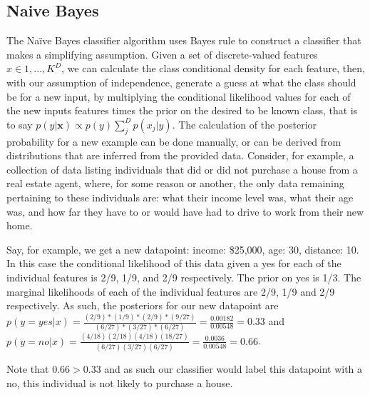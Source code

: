\subsection{Naive Bayes}
The Na\"{i}ve Bayes classifier algorithm uses Bayes rule to construct a classifier
that makes a simplifying assumption. Given a set of discrete-valued
features $x \in {1,...,K}^D$, we can calculate the class conditional density for
each feature, then, with our assumption of independence, generate a guess
at what the class should be for a new input, by multiplying the conditional
likelihood values for each of the new inputs features times the prior on the
desired to be known class, that is to say
$p(y|\textbf{x}) \propto p(y) \sum_{j}^{D}p(x_j|y)$.
The calculation of the posterior probability for a new example can be done
manually, or can be derived from distributions that are inferred from the
provided data. Consider, for example, a collection of data listing individuals
that did or did not purchase a house from a real estate agent, where, for some
reason or another, the only data remaining pertaining to these individuals are:
what their income level was, what their age was, and how far they have to or
would have had to drive to work from their new home.

Say, for example, we get a new datapoint: income: \$25,000, age: 30, distance: 10. In this
case the conditional likelihood of this data given a yes for each of the
individual features is 2/9, 1/9, and 2/9 respectively. The prior on yes is 1/3.
The marginal likelihoods of each of the individual features are 2/9, 1/9 and 2/9
respectively. As such, the posteriors for our new datapoint are
$p(y=yes|x)=\frac{(2/9)*(1/9)*(2/9)*(9/27)}{(6/27)*(3/27)*(6/27)} = \frac{0.00182}{0.00548} = 0.33$ and $p(y=no|x)=\frac{(4/18)(2/18)(4/18)(18/27)}{(6/27)(3/27)(6/27)} = \frac{0.0036}{0.00548} = 0.66$.

Note that $0.66 > 0.33$ and as such our classifier would label this datapoint
with a no, this individual is not likely to purchase a house.

